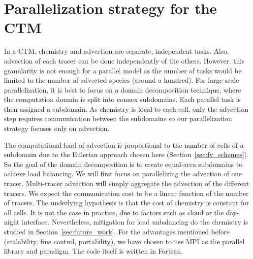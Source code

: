 \label{subsubsec:paradigms}

\section{Parallelization strategy for the CTM}
\label{sec:strategy}
In a CTM, chemistry and advection are separate, independent tasks. Also,
advection of each tracer can be done independently of the others. However, this
granularity is not enough for a parallel model as the number of tasks would be
limited to the number of advected species (around a hundred). For large-scale
parallelization, it is best to focus on a domain decomposition technique, where
the computation domain is split into connex subdomains. Each parallel task is
then assigned a subdomain. As chemistry is local to each cell, only the
advection step requires communication between the subdomains so our
parallelization strategy focuses only on advection.

The computational load of advection is proportional to the number of
cells of a subdomain due to the Eulerian approach chosen here
(Section~\ref{sec:fv_schemes}). So the goal of the domain decomposition is to
create equal-area subdomains to achieve load balancing. We will first
focus on parallelizing the advection of one tracer. Multi-tracer advection will
simply aggregate the advection of the different tracers. We expect the
communication cost to be a linear function of the number of tracers.  The
underlying hypothesis is that the cost of chemistry is constant for all cells.
It is not the case in practice, due to factors such as cloud or the day-night
interface. Nevertheless, mitigation for load unbalancing do the chemistry is
studied in Section~\ref{sec:future_work}. For the advantages mentioned before
(scalability, fine control, portability), we have chosen to use MPI as the
parallel library and paradigm. The code itself is written in Fortran.

